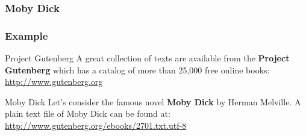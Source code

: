 \documentclass{beamer}\usepackage[]{graphicx}\usepackage[]{color}
\begin{document}
{ %
    \begin{frame}[plain]
    \frametitle{Moby Dick}
     \end{frame}
}


\begin{frame}[fragile]
\frametitle{Example}

\begin{block}{Project Gutenberg}
A great collection of texts are available from the \textbf{Project Gutenberg} which has a catalog of more than 25,000 free online books: \\
{ \footnotesize \url{http://www.gutenberg.org}}
\end{block}

\begin{block}{Moby Dick}
Let's consider the famous novel \textbf{Moby Dick} by Herman Melville. 
A plain text file of Moby Dick can be found at: \\
{ \footnotesize \url{http://www.gutenberg.org/ebooks/2701.txt.utf-8}}
\end{block}

\end{frame}

\end{document}
